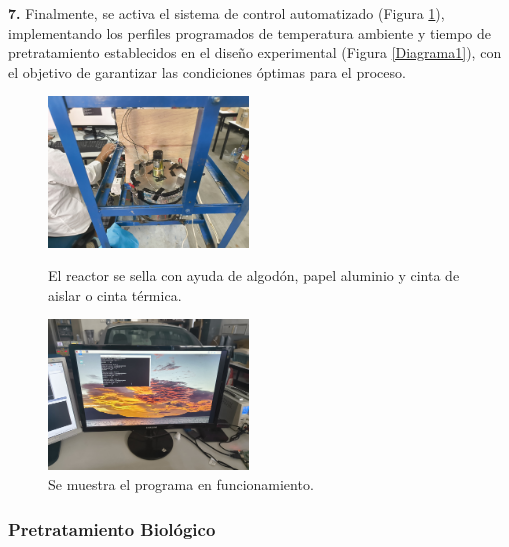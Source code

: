 \documentclass[12pt]{article}
\begin{document}
			\textbf{7.} Finalmente, se activa el sistema de control automatizado (Figura \ref{programa}), implementando los perfiles programados de temperatura ambiente y tiempo de pretratamiento establecidos en el diseño experimental (Figura \ref{Diagrama1}), con el objetivo de garantizar las condiciones óptimas para el proceso.
			
			
			\begin{figure}[H]
			\centering
			\begin{minipage}{0.46\textwidth}
				\centering
				\includegraphics[width=\linewidth, height=4cm, keepaspectratio]{imagenes/sellado2}
				\caption{El reactor se sella con ayuda de algodón, papel aluminio y cinta de aislar o cinta térmica.}
				\label{sellado_bio}
			\end{minipage}
			\hfill
			\begin{minipage}{0.48\textwidth}
					\centering
				\includegraphics[width=\linewidth, height=4cm, keepaspectratio]{imagenes/programa3}
				\caption{Se muestra el programa en funcionamiento.}
				\label{programa}
			\end{minipage}
		\end{figure}
			
		
			
			\subsubsection{Pretratamiento Biológico}
	
\end{document}
